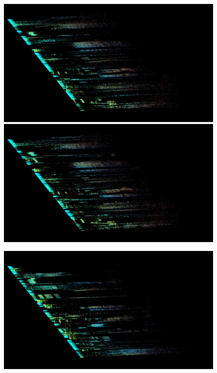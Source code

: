 \documentclass{article}
\begin{document}
\begin{figure}
\begin{multicols}{2}
    \includegraphics[width=\linewidth]{preset-50-9.jpg}%
    \includegraphics[width=\linewidth]{preset-50-10.jpg}%
    \end{multicols}
\begin{multicols}{2}
    \includegraphics[width=\linewidth]{preset-50-1.jpg}%

\end{multicols}
\end{figure}
\end{document}
